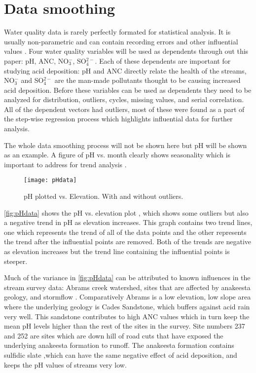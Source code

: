 \section{Data smoothing}%
Water quality data is rarely perfectly formated for statistical analysis.
It is usually  non-parametric and can contain recording errors and other influential values \citep{helsel1992statistical}.
Four water quality variables will be used as dependents through out this paper: pH, ANC, NO$_3^-$, SO$_4^{2-}$.
Each of these dependents are important for studying acid deposition: pH and ANC directly relate the health of the streams, NO$_3^-$ and SO$_4^{2-}$ are the man-made pollutants thought to be causing increased acid deposition.
Before these variables can be used as dependents they need to be analyzed for distribution, outliers, cycles, missing values, and serial correlation\citep{helsel1992statistical}.
All of the dependent vectors had outliers, most of these were found as a part of the step-wise regression process which highlights influential data for further analysis.

The whole data smoothing process will not be shown here but pH will be shown as an example.
A figure of pH vs. month clearly shows seasonality which is important to address for trend analysis \citep{helsel1992statistical}.

\begin{figure}[h!]
\centering
	\texttt{[image: pHdata]}\\
	\caption{pH plotted vs. Elevation. With and without outliers.}
	\label{fig:pHdata}
\end{figure}

\autoref{fig:pHdata} shows the pH vs. elevation plot , which shows some outliers but also a negative trend in pH as elevation increases.
This graph contains two trend lines, one which represents the trend of all of the data points and the other represents the trend after the influential points are removed. 
Both of the trends are negative as elevation increases but the trend line containing the influential points is steeper. 

Much of the variance in \autoref{fig:pHdata} can be attributed to known influences in the stream survey data: Abrams creek watershed, sites that are affected by anakeesta geology, and stormflow \citep{neff2012influence}.  
Comparatively Abrams is a low elevation, low slope area where the underlying geology is Cades Sandstone, which buffers against acid rain very well. 
This sandstone contributes to high ANC values which in turn keep the mean pH levels higher than the rest of the sites in the survey. 
Site numbers 237 and 252 are sites which are down hill of road cuts that have exposed the underlying anakeesta formation to runoff.  
The anakeesta formation contains sulfidic slate ,which can have the same negative effect of acid deposition,  and keeps the pH values of streams very low.

